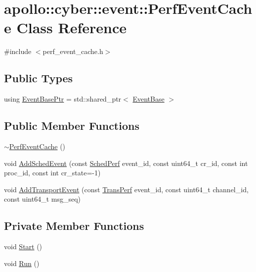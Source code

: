 \hypertarget{classapollo_1_1cyber_1_1event_1_1PerfEventCache}{\section{apollo\-:\-:cyber\-:\-:event\-:\-:Perf\-Event\-Cache Class Reference}
\label{classapollo_1_1cyber_1_1event_1_1PerfEventCache}
}


{\ttfamily \#include $<$perf\-\_\-event\-\_\-cache.\-h$>$}

\subsection*{Public Types}
\begin{DoxyCompactItemize}
\item 
using \hyperlink{classapollo_1_1cyber_1_1event_1_1PerfEventCache_a97c9a532fd89d72c664547eba0f39525}{Event\-Base\-Ptr} = std\-::shared\-\_\-ptr$<$ \hyperlink{classapollo_1_1cyber_1_1event_1_1EventBase}{Event\-Base} $>$
\end{DoxyCompactItemize}
\subsection*{Public Member Functions}
\begin{DoxyCompactItemize}
\item 
\hyperlink{classapollo_1_1cyber_1_1event_1_1PerfEventCache_a5225c72f643d172f8a02beeb6eb84b51}{$\sim$\-Perf\-Event\-Cache} ()
\item 
void \hyperlink{classapollo_1_1cyber_1_1event_1_1PerfEventCache_a8046148fae61146484ce98d2694c0a0c}{Add\-Sched\-Event} (const \hyperlink{namespaceapollo_1_1cyber_1_1event_ab72445ee0247295d6699d5f251e11b83}{Sched\-Perf} event\-\_\-id, const uint64\-\_\-t cr\-\_\-id, const int proc\-\_\-id, const int cr\-\_\-state=-\/1)
\item 
void \hyperlink{classapollo_1_1cyber_1_1event_1_1PerfEventCache_a2d915a242d915c6247de01cd54086488}{Add\-Transport\-Event} (const \hyperlink{namespaceapollo_1_1cyber_1_1event_a2918dc8c778172bc4a921da7fe02ad84}{Trans\-Perf} event\-\_\-id, const uint64\-\_\-t channel\-\_\-id, const uint64\-\_\-t msg\-\_\-seq)
\end{DoxyCompactItemize}
\subsection*{Private Member Functions}
\begin{DoxyCompactItemize}
\item 
void \hyperlink{classapollo_1_1cyber_1_1event_1_1PerfEventCache_aadc41f95023b4a56b5d119a08a69ffd5}{Start} ()
\item 
void \hyperlink{classapollo_1_1cyber_1_1event_1_1PerfEventCache_ad981b82b1aa24d850346eb9ec1307aec}{Run} ()
\end{DoxyCompactItemize}

